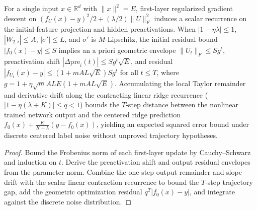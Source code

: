\begin{lemma}\label{lem:mlp_single_trajectory}
\leanok
{}
For a single input $x\in\mathbb{R}^d$ with $\|x\|^2=E$, first-layer regularized gradient descent on $(f_U(x)-y)^2/2 + (\lambda/2)\|U\|_F^2$ induces a scalar recurrence on the initial-feature projection and hidden preactivations. When $|1-\eta\lambda|\le 1$, $|W_{2,i}|\le A$, $|\sigma'|\le L$, and $\sigma'$ is $M$-Lipschitz, the initial residual bound $|f_0(x)-y|\le S$ implies an a priori geometric envelope $\|U_t\|_F\le S g^t$, preactivation shift $|\Delta\mathrm{pre}_i(t)|\le S g^t\sqrt{E}$, and residual $|f_{U_t}(x)-y|\le (1+m A L\sqrt{E})S g^t$ for all $t\le T$, where $g=1+\eta\sqrt{m}A L E(1+m A L\sqrt{E})$. Accumulating the local Taylor remainder and derivative drift along the contracting linear ridge recurrence ($|1-\eta(\lambda+K)|\le q<1$) bounds the $T$-step distance between the nonlinear trained network output and the centered ridge prediction $f_0(x)+\frac{K}{K+\lambda}(y-f_0(x))$, yielding an expected squared error bound under discrete centered label noise without unproved trajectory hypotheses.
\end{lemma}
\begin{proof}
\leanok
Bound the Frobenius norm of each first-layer update by Cauchy--Schwarz and induction on $t$. Derive the preactivation shift and output residual envelopes from the parameter norm. Combine the one-step output remainder and slope drift with the scalar linear contraction recurrence to bound the $T$-step trajectory gap, add the geometric optimization residual $q^T|f_0(x)-y|$, and integrate against the discrete noise distribution.
\end{proof}

